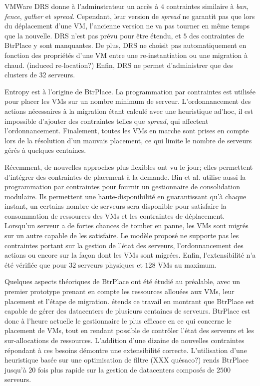 \documentclass[a4paper]{article}
\begin{document}
VMWare DRS donne à l'adminstrateur un accès à $4$ contraintes
similaire à \textit{ban}, \textit{fence}, \textit{gather} et
\textit{spread}. Cependant, leur version de \textit{spread}
ne garantit pas que lors du déplacement d'une VM, l'ancienne
version ne va pas tourner en même temps que la nouvelle.
DRS n'est pas prévu pour être étendu, et $5$ des contraintes
de BtrPlace y sont manquantes. De plus, DRS ne choisit pas
automatiquement en fonction des propriétés d'une VM entre
une re-instantiation ou une migration à chaud. (induced re-location?)
Enfin, DRS ne permet d'administrer que des clusters de $32$
serveurs.

Entropy est à l'origine de BtrPlace. La programmation par contraintes
est utilisée pour placer les VMs sur un nombre minimum de serveur.
L'ordonnancement des actions nécessaires à la migration étant calculé
avec une heuristique ad'hoc, il est impossible d'ajouter des
contraintes telles que \textit{spread}, qui affectent l'ordonnancement.
Finalement, toutes les VMs en marche sont prises en compte lors
de la résolution d'un mauvais placement, ce qui limite le nombre
de serveurs gérés à quelques centaines.

Récemment, de nouvelles approches plus flexibles ont vu le jour;
elles permettent d'intégrer des contraintes de placement à la
demande. Bin et al. utilise aussi la programmation par contraintes
pour fournir un gestionnaire de consolidation modulaire. Ils
permettent une haute-disponibilité en guarantissant qu'à chaque instant,
un certains nombre de serveurs sera disponible pour satisfaire
la consommation de ressources des VMs et les contraintes de
déplacement. Lorsqu'un serveur a de fortes chances de tomber en panne,
les VMs sont migrés sur un autre capable de les satisfaire. Le modèle
proposé ne supporte pas les contraintes portant sur la gestion de
l'état des serveurs, l'ordonnancement des actions ou encore sur la
façon dont les VMs sont migrées. Enfin, l'extensibilité n'a été
vérifiée que pour $32$ serveurs physiques et $128$ VMs au maximum.

Quelques aspects théoriques de BtrPlace ont été étudié au préalable,
avec un premier prototype prenant en compte les ressources allouées
aux VMs, leur placement et l'étape de migration. \cite{herm2012}
étends ce travail en montrant que BtrPlace est capable de gérer
des datacenters de plusieurs centaines de serveurs. BtrPlace
est donc à l'heure actuelle le gestionnaire le plus efficace en
ce qui concerne le placement de VMs, tout en rendant possible
de contrôler l'état des serveurs et les sur-allocations de ressources.
L'addition d'une dizaine de nouvelles contraintes répondant à
ces besoins démontre une extensibilité correcte. L'utilisation
d'une heuristique basée sur une optimisation de filtre (XXX quésaco?)
rends BtrPlace jusqu'à $20$ fois plus rapide sur la gestion de
datacenters composés de $2500$ serveurs.
\end{document}
